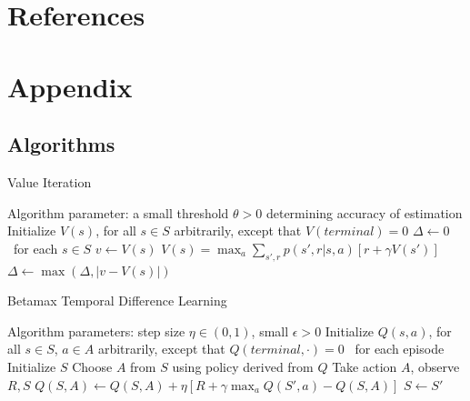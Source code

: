 \documentclass[11pt]{article} %
\begin{document}
\section{References}




\section{Appendix}
\subsection{Algorithms}

\begin{algorithm}
  \caption{Value Iteration}

  \State Algorithm parameter: a small threshold $\theta > 0$ determining accuracy of estimation
  \State Initialize $V(s)$, for all $s \in S$ arbitrarily, except that $V(terminal) = 0$
  \State
  \While{$\Delta > \theta$}
    \State $\Delta \leftarrow 0$
    \Loop \ for each $s \in S$
      \State $v \leftarrow V(s)$
      \State $ V(s) = \max_a \sum_{s',r} p(s',r|s,a) \left[ r + \gamma V(s') \right] $
      \State $\Delta \leftarrow \max(\Delta, |v - V(s)|)$
    \EndLoop
  \EndWhile

\end{algorithm}

\begin{algorithm}
  \caption{Betamax Temporal Difference Learning}

  \State Algorithm parameters: step size $\eta \in (0, 1)$, small $\epsilon > 0$
  \State Initialize $Q(s,a)$, for all $s \in S$, $a \in A$ arbitrarily, except that $Q(terminal,\cdot) = 0$
  \State
  \Loop \ for each episode
    \State Initialize $S$
      \State Choose $A$ from $S$ using policy derived from $Q$
      \State Take action $A$, observe $R, S$
      \State $Q(S, A) \leftarrow Q(S, A) + \eta \left[ R + \gamma \max_a Q(S',a) − Q(S, A) \right] $
      \State $S \leftarrow S'$
    \EndWhile
  \EndLoop

\end{algorithm}
\end{document}
